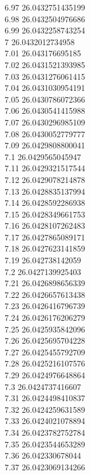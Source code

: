 {6.97	26.0432751435199\\
6.98	26.0432504976686\\
6.99	26.0432258743254\\
7	26.0432012734958\\
7.01	26.043176695185\\
7.02	26.0431521393985\\
7.03	26.0431276061415\\
7.04	26.0431030954191\\
7.05	26.0430786072366\\
7.06	26.0430541415988\\
7.07	26.0430296985109\\
7.08	26.0430052779777\\
7.09	26.0429808800041\\
7.1	26.0429565045947\\
7.11	26.0429321517544\\
7.12	26.0429078214878\\
7.13	26.0428835137994\\
7.14	26.0428592286938\\
7.15	26.0428349661753\\
7.16	26.0428107262483\\
7.17	26.0427865089171\\
7.18	26.0427623141859\\
7.19	26.042738142059\\
7.2	26.0427139925403\\
7.21	26.0426898656339\\
7.22	26.0426657613438\\
7.23	26.0426416796739\\
7.24	26.0426176206279\\
7.25	26.0425935842096\\
7.26	26.0425695704228\\
7.27	26.0425455792709\\
7.28	26.0425216107576\\
7.29	26.0424976648864\\
7.3	26.0424737416607\\
7.31	26.0424498410837\\
7.32	26.0424259631589\\
7.33	26.0424021078894\\
7.34	26.0423782752784\\
7.35	26.0423544653289\\
7.36	26.042330678044\\
7.37	26.0423069134266\\
}

